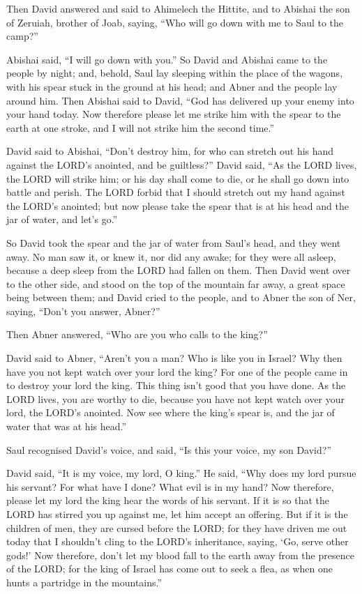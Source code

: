  Then David answered and said to Ahimelech the Hittite,
and to Abishai the son of Zeruiah, brother of Joab, saying, ``Who will
go down with me to Saul to the camp?''

Abishai said, ``I will go down with you.''  So David and
Abishai came to the people by night; and, behold, Saul lay sleeping
within the place of the wagons, with his spear stuck in the ground at
his head; and Abner and the people lay around him.  Then
Abishai said to David, ``God has delivered up your enemy into your hand
today. Now therefore please let me strike him with the spear to the
earth at one stroke, and I will not strike him the second time.''

 David said to Abishai, ``Don't destroy him, for who can
stretch out his hand against the LORD's anointed, and be guiltless?''
 David said, ``As the LORD lives, the LORD will strike
him; or his day shall come to die, or he shall go down into battle and
perish.  The LORD forbid that I should stretch out my
hand against the LORD's anointed; but now please take the spear that is
at his head and the jar of water, and let's go.''

 So David took the spear and the jar of water from Saul's
head, and they went away. No man saw it, or knew it, nor did any awake;
for they were all asleep, because a deep sleep from the LORD had fallen
on them.  Then David went over to the other side, and
stood on the top of the mountain far away, a great space being between
them;  and David cried to the people, and to Abner the
son of Ner, saying, ``Don't you answer, Abner?''

Then Abner answered, ``Who are you who calls to the king?''

 David said to Abner, ``Aren't you a man? Who is like you
in Israel? Why then have you not kept watch over your lord the king? For
one of the people came in to destroy your lord the king. 
This thing isn't good that you have done. As the LORD lives, you are
worthy to die, because you have not kept watch over your lord, the
LORD's anointed. Now see where the king's spear is, and the jar of water
that was at his head.''

 Saul recognised David's voice, and said, ``Is this your
voice, my son David?''

David said, ``It is my voice, my lord, O king.''  He
said, ``Why does my lord pursue his servant? For what have I done? What
evil is in my hand?  Now therefore, please let my lord
the king hear the words of his servant. If it is so that the LORD has
stirred you up against me, let him accept an offering. But if it is the
children of men, they are cursed before the LORD; for they have driven
me out today that I shouldn't cling to the LORD's inheritance, saying,
`Go, serve other gods!'  Now therefore, don't let my
blood fall to the earth away from the presence of the LORD; for the king
of Israel has come out to seek a flea, as when one hunts a partridge in
the mountains.''


